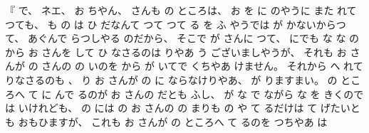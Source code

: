 %
『
で、
%
ネエ、
%
お
ちやん、
%
さんも
の
ところは、
%
お
を
に
のやうに
また
れて
つても、
%
も
の
は
ひ
だなんて
つて
つて
る
を%
ふ
やうでは
が
かないからつて、
%
あぐんで
らつしやる
のだから、
%
そこで
が
さんに
つて、
%
にでも
な
な
の
から
お
さんを
して
ひ
なさるのは
りやあ
う
ございましやうが、
%
それも
お
さんが
の
さんの
の
いのを
から%
が
いてで
くちやあ
けません。
%
それから
へ
れて
りなさるのも
、
%
%
り%
お
さんが
の
に
ならなけりやあ、
%
が%
りますまい。
%
の
ところへ
て
に
んで
るのが
お
さんの
%
だとも
ふし、
%
が
な
で
ながら
な
を
きくのでは
いけれども、
%
の
には
の
お
さんの
の
%
まりも
の
や
て
るだけは
て
げたいとも
おもひますが、
%
これも
お
さんが
の
ところへ
て
るのを
つちやあ
は
